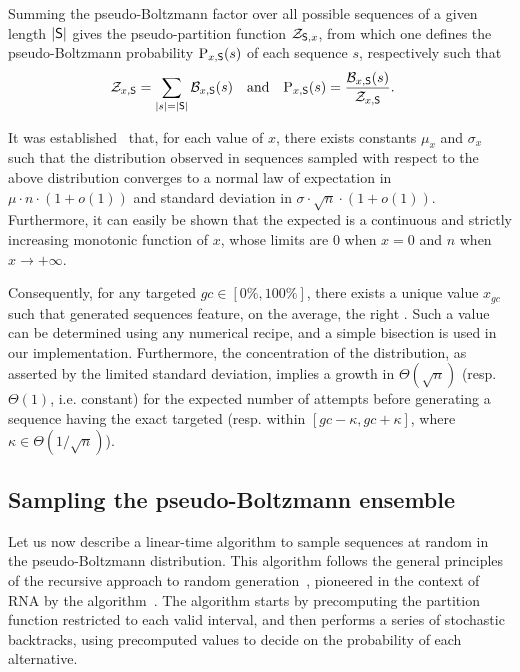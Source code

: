 Summing the pseudo-Boltzmann factor over all possible sequences of a given length $|\text{\sf S}|$ gives the pseudo-partition function $\mathcal{Z}_{\text{\sf S},x}$, from which one defines the pseudo-Boltzmann probability $\text{P}_{x,\text{\sf S}}(s)$ of each sequence $s$, respectively such that 
\begin{align}\mathcal{Z}_{x,\text{\sf S}} &= \sum_{\substack{|s|=|\text{\sf S}|}}\mathcal{B}_{x,\text{\sf S}}(s)& \text{and}&&
\text{P}_{x,\text{\sf S}}(s) &= \frac{\mathcal{B}_{x,\text{\sf S}}(s)}{\mathcal{Z}_{x,\text{\sf S}}}.\label{def:distribution}\end{align}

It was established~\cite{Waldispuhl2011} that, for each value of $x$, there exists constants $\mu_x$ and $\sigma_x$ such that the \GCContent distribution observed in sequences sampled with respect to the above distribution converges to a normal law of expectation in $\mu\cdot n\cdot(1+o(1))$ and standard deviation in $\sigma\cdot\sqrt{n}\cdot(1+o(1))$.
Furthermore, it can easily be shown that the expected \GCContent is a continuous and strictly increasing monotonic  function of $x$, whose limits are $0$ when $x=0$ and $n$ when $x\to +\infty$. 

Consequently, for any targeted \GCContent $gc\in[0\%,100\%]$, there exists a unique value $x_{gc}$ such that generated sequences feature, on the average, the right \GCContent. Such a value can be determined using any numerical recipe, and a simple bisection is used in our implementation. Furthermore, the concentration of the distribution, as asserted by the limited standard deviation, implies a growth in $\Theta(\sqrt{n})$ (resp. $\Theta(1)$, i.e. constant) for the expected number of attempts before generating a sequence having the exact targeted \GCContent  (resp. within $[gc-\kappa,gc+\kappa]$, where $\kappa\in\Theta(1/\sqrt n)$).

\subsection{Sampling the pseudo-Boltzmann ensemble}

Let us now describe a linear-time algorithm to sample sequences at random in the pseudo-Boltzmann distribution. This algorithm follows the general principles of the recursive approach to random generation~\cite{Wilf1977}, pioneered in the context of RNA by the \SFold algorithm~\cite{Ding2003}. The algorithm starts by precomputing the partition function restricted to each valid interval, and then performs a series of stochastic backtracks, using precomputed values to decide on the probability of each alternative.

